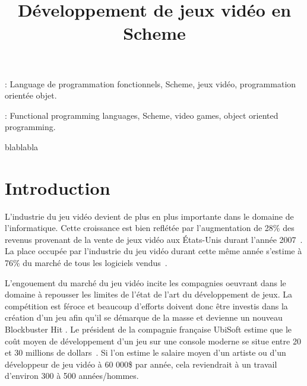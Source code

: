 \documentclass[12pt,oneside,letterpaper,francais]{book}
\title{Développement de jeux vidéo en Scheme}
\begin{document}
\setcounter{page}{1}
 \PagesCouverture

\resume


\vspace{2em}

: Language de programmation fonctionnels,
Scheme, jeux vidéo, programmation orientée objet.

\abstract



\vspace{2em}

: Functional programming languages, Scheme,
video games, object oriented programming.



 
\tabledesmatieres

\listedestableaux

\listedesfigures


\remerciements

blablabla

% 

\debutchapitres

\chapter{Introduction}
\label{Chap:Intro}

L'industrie du jeu vidéo devient de plus en plus importante dans le
domaine de l'informatique. Cette croissance est bien reflétée par
l'augmentation de 28\% des revenus provenant de la vente de jeux vidéo
aux États-Unis durant l'année 2007~\cite{NPD_Games_2007}. La place
occupée par l'industrie du jeu vidéo durant cette même année s'estime
à 76\% du marché de tous les logiciels vendus~\cite{NPD_Soft_2008}. 

L'engouement du marché du jeu vidéo incite les compagnies oeuvrant
dans le domaine à repousser les limites de l'état de l'art du
développement de jeux. La compétition est féroce et beaucoup
d'efforts doivent donc être investis dans la création d'un jeu afin qu'il
se démarque de la masse et devienne un nouveau \og Blockbuster Hit
\fg. Le président de la compagnie française UbiSoft estime que le coût
moyen de développement d'un jeu sur une console moderne se situe entre
20 et 30 millions de dollars~\cite{cbc_ubisoft}. Si l'on estime le
salaire moyen d'un artiste ou d'un développeur de jeu vidéo à 60
000\$ par année, cela reviendrait à un travail d'environ 300 à 500
années/hommes.
\end{document}
